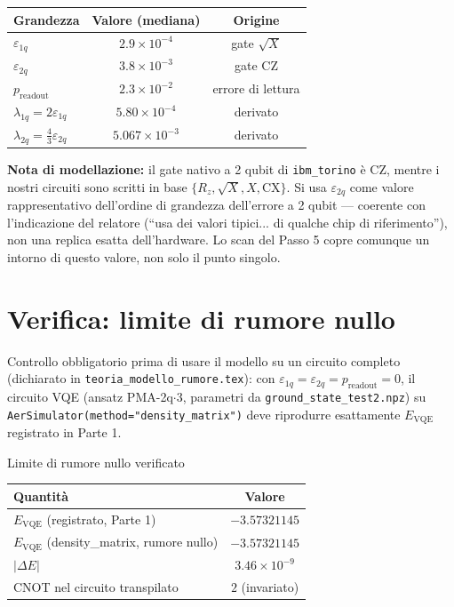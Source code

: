 \documentclass[11pt,a4paper]{article}
\begin{document}
\begin{center}
\renewcommand{\arraystretch}{1.25}
\begin{tabular}{@{}lcc@{}}
\toprule
\textbf{Grandezza} & \textbf{Valore (mediana)} & \textbf{Origine} \\
\midrule
$\varepsilon_{1q}$ & $2.9\times10^{-4}$ & gate $\sqrt X$ \\
$\varepsilon_{2q}$ & $3.8\times10^{-3}$ & gate CZ \\
$p_\text{readout}$ & $2.3\times10^{-2}$ & errore di lettura \\
\midrule
$\lambda_{1q}=2\varepsilon_{1q}$ & $5.80\times10^{-4}$ & derivato \\
$\lambda_{2q}=\tfrac43\varepsilon_{2q}$ & $5.067\times10^{-3}$ & derivato \\
\bottomrule
\end{tabular}
\end{center}

\noindent \textbf{Nota di modellazione:} il gate nativo a 2 qubit di
\texttt{ibm\_torino} è CZ, mentre i nostri circuiti sono scritti in base
$\{R_z,\sqrt X,X,\text{CX}\}$. Si usa $\varepsilon_{2q}$ come valore
rappresentativo dell'ordine di grandezza dell'errore a 2 qubit --- coerente
con l'indicazione del relatore (``usa dei valori tipici... di qualche chip
di riferimento''), non una replica esatta dell'hardware. Lo scan del Passo 5
copre comunque un intorno di questo valore, non solo il punto singolo.

\section*{Verifica: limite di rumore nullo}

Controllo obbligatorio prima di usare il modello su un circuito completo
(dichiarato in \texttt{teoria\_modello\_rumore.tex}): con
$\varepsilon_{1q}=\varepsilon_{2q}=p_\text{readout}=0$, il circuito VQE
(ansatz PMA-2q$\cdot$3, parametri da \texttt{ground\_state\_test2.npz}) su
\texttt{AerSimulator(method="density\_matrix")} deve riprodurre esattamente
$E_\text{VQE}$ registrato in Parte 1.

\begin{okbox}{Limite di rumore nullo verificato}
\begin{center}
\renewcommand{\arraystretch}{1.25}
\begin{tabular}{@{}lc@{}}
\toprule
\textbf{Quantità} & \textbf{Valore}\\
\midrule
$E_\text{VQE}$ (registrato, Parte 1) & $-3.57321145$\\
$E_\text{VQE}$ (density\_matrix, rumore nullo) & $-3.57321145$\\
$|\Delta E|$ & $3.46\times10^{-9}$\\
CNOT nel circuito transpilato & $2$ (invariato)\\
\bottomrule
\end{tabular}
\end{center}
\end{okbox}
\end{document}
